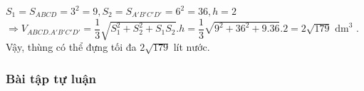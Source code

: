 \begin{vd}
{\begin{enumEX}[a)]{1}
{
			}
			$S_1=S_{ABCD}=3^2=9, S_2=S_{A'B'C'D'}=6^2=36, h = 2 $\\
			$\Rightarrow V_{ABCD.A'B'C'D'}=\dfrac{1}{3} \sqrt{S_1^2+S_2^2+S_1S_2}.h = \dfrac{1}{3} \sqrt{9^2+36^2+9.36}.2=2\sqrt{179} \text{ dm}^3$ .\\
			Vậy, thùng có thể đựng tối đa $2\sqrt{179}$ lít nước.
		\end{enumEX}
	}
\end{vd}



\subsubsection{Bài tập tự luận}

